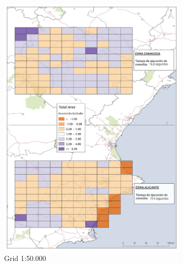 \begin{figure}
\begin{subfigure}[b]{0.4\textwidth}
    \includegraphics[width=\textwidth]{ResultadosyDiscusion/Figs/Results/l_50.pdf}
    \caption{Grid 1:50.000}
    \label{fig:l_50}
  \end{subfigure}             
  \begin{subfigure}[b]{0.4\textwidth}

\end{subfigure}
\end{figure}
